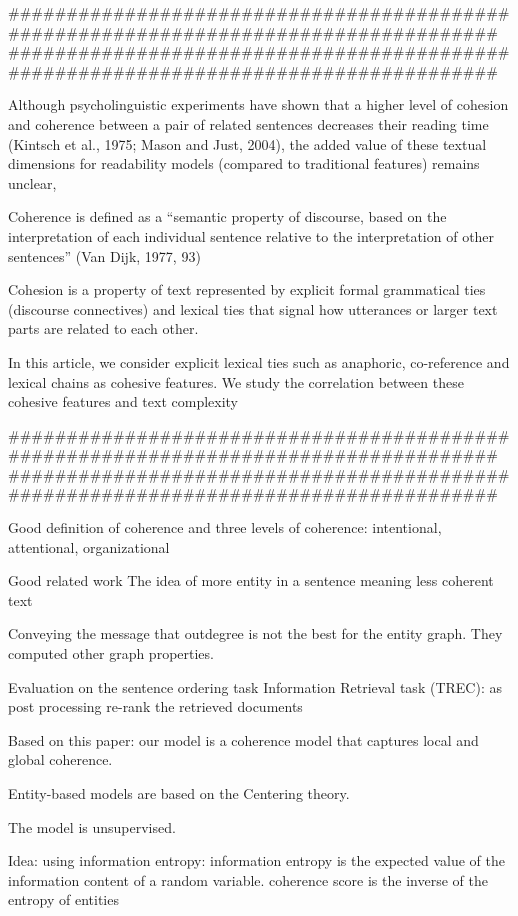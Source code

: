 #####################################################################################
\cite{todirascu16}
#####################################################################################

Although psycholinguistic experiments have shown that a higher level of cohesion and coherence between a pair of
related sentences decreases their reading time (Kintsch et al., 1975; Mason and Just, 2004), the added
value of these textual dimensions for readability models (compared to traditional features) remains unclear, 

Coherence is defined as a “semantic property of discourse, based on the interpretation of each individual
sentence relative to the interpretation of other sentences” (Van Dijk, 1977, 93)

Cohesion is a property of text represented by explicit formal grammatical ties (discourse connectives)
and lexical ties that signal how utterances or larger text parts are related to each other.

In this article, we consider explicit lexical ties such as anaphoric, co-reference and lexical chains as
cohesive features. We study the correlation between these cohesive features and text complexity


#####################################################################################
\cite{petersencasper15}
#####################################################################################

Good definition of coherence and three levels of coherence: intentional, attentional, organizational 

Good related work
The idea of more entity in a sentence meaning less coherent text

Conveying the message that outdegree is not the best for the entity graph. They computed other graph properties.

Evaluation on 
	the sentence ordering task
	Information Retrieval task (TREC): as post processing re-rank the retrieved documents

Based on this paper: our model is a coherence model that captures local and global coherence.

Entity-based models are based on the Centering theory.

The model is unsupervised.

Idea: using information entropy: information entropy is the expected value of the information content of a random variable. coherence score is the inverse of the entropy of entities

